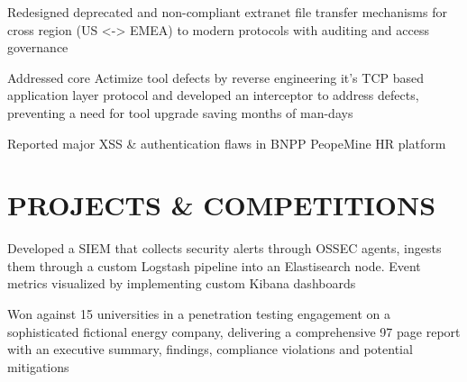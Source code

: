 \documentclass[letterpaper]{deedy-resume} %
\begin{document}
\begin{minipage}[t]{0.66\textwidth}
\begin{tightitemize}
\item Redesigned deprecated and non-compliant extranet file transfer mechanisms for cross region (US <-> EMEA) to modern protocols with auditing and access governance
\item  Addressed core Actimize tool defects by reverse engineering it's TCP based application layer protocol and developed an interceptor to address defects, preventing a need for tool upgrade saving months of man-days
\item  Reported major XSS \& authentication flaws in BNPP PeopeMine HR platform
\end{tightitemize}

\sectionspace %



\section{PROJECTS \& COMPETITIONS}



Developed a SIEM that collects security alerts through OSSEC agents, ingests them through a custom Logstash pipeline into an Elastisearch node. Event metrics visualized by implementing custom Kibana dashboards

\sectionspace %



Won against 15 universities in a penetration testing engagement on a sophisticated fictional energy company, delivering a comprehensive 97 page report with an executive summary, findings, compliance violations and potential mitigations


\end{minipage}
\end{document}
